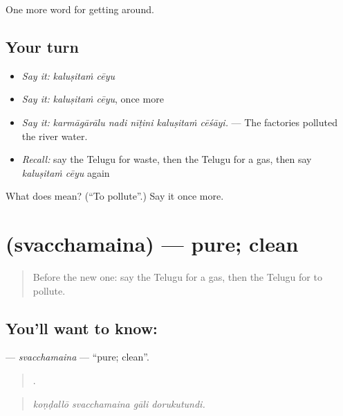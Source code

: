\begin{grammarlens}[title={What you've built}]
One more word for getting around.
\end{grammarlens}

\subsection*{Your turn}
\begin{itemize}
\raggedright
  \item \emph{Say it:} \emph{kaluṣitaṁ cēyu}
  \item \emph{Say it:} \emph{kaluṣitaṁ cēyu}, once more
  \item \emph{Say it:} \emph{karmāgārālu nadi nīṭini kaluṣitaṁ cēśāyi.} — The factories polluted the river water.
  \item \emph{Recall:} say the Telugu for waste, then the Telugu for a gas, then say \emph{kaluṣitaṁ cēyu} again
\end{itemize}

\begin{tcolorbox}[breakable,colback=teal!4,colframe=teal!35!black,title={Before you move on}]
What does   mean? (\textquotedblleft{}To pollute\textquotedblright{}.) Say it once more.
\end{tcolorbox}
\section[\texorpdfstring{\te{స్వచ్ఛమైన} (svacchamaina)}{స్వచ్ఛమైన (svacchamaina)}]{ (svacchamaina) — pure; clean}

\label{lesson:TE-C470-svacchamaina}



\begin{quote}
Before the new one: say the Telugu for a gas, then the Telugu for to pollute.
\end{quote}

\subsection*{You'll want to know: }
\textbf{} — \emph{svacchamaina} — \textquotedblleft{}pure; clean\textquotedblright{}.

\begin{quote}
   .
\end{quote}

\begin{quote}
\emph{koṇḍallō svacchamaina gāli dorukutundi.}
\end{quote}

